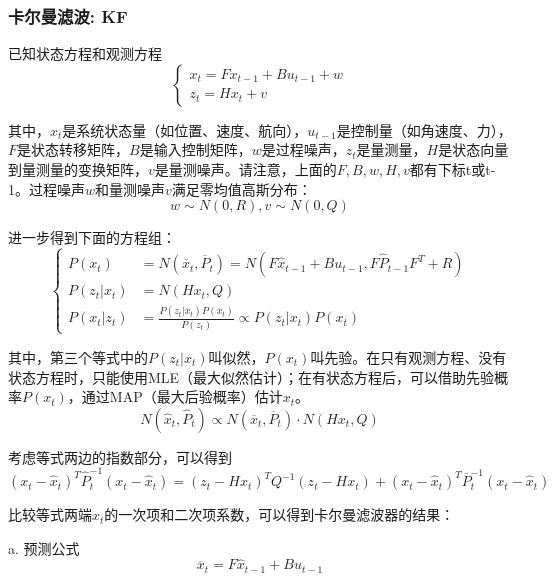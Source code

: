 \subsubsection*{卡尔曼滤波: KF}
已知状态方程和观测方程
\begin{equation}
  \left\{
  \begin{array}{lr}
    x_t = F x_{t-1} + B u_{t-1} + w \\
    z_t = H x_t + v
  \end{array}
  \right.
\end{equation}
\par 其中，$x_t$是系统状态量（如位置、速度、航向），$u_{t-1}$是控制量（如角速度、力），$F$是状态转移矩阵，$B$是输入控制矩阵，$w$是过程噪声，$z_t$是量测量，$H$是状态向量到量测量的变换矩阵，$v$是量测噪声。请注意，上面的$F,B,w,H,v$都有下标t或t-1。过程噪声$w$和量测噪声$v$满足零均值高斯分布：
\begin{equation}
  w \sim N(0,R),v \sim N(0,Q)
\end{equation}
\par 进一步得到下面的方程组：
\begin{equation}
  \left\{
  \begin{split}
    P(x_t)
    &=N(\overline{x}_t,\overline{P}_t)
    =N(F \hat{x}_{t-1} + B u_{t-1}, F \hat{P}_{t-1} F^T + R) \\
    P(z_t|x_t) &=N(H x_t,Q) \\
    P(x_t|z_t) &= \frac{P(z_t|x_t) P(x_t)}{P(z_t)} \propto P(z_t|x_t) P(x_t)
  \end{split}
  \right.
\end{equation}
\par 其中，第三个等式中的$P(z_t|x_t)$叫似然，$P(x_t)$叫先验。在只有观测方程、没有状态方程时，只能使用MLE（最大似然估计）；在有状态方程后，可以借助先验概率$P(x_t)$，通过MAP（最大后验概率）估计$x_t$。
\begin{equation}
  N(\hat{x}_t,\hat{P}_t) \propto N(\overline{x}_t,\overline{P}_t) \cdot N(H x_t,Q)
\end{equation}
\par 考虑等式两边的指数部分，可以得到
\begin{equation}
  (x_t-\hat{x}_t)^T\hat{P}_t^{-1}(x_t-\hat{x}_t)
  =
  (z_t-H x_t)^T Q^{-1} (z_t-H x_t)
  +
  (x_t-\hat{x}_t)^T \overline{P}_t^{-1} (x_t-\hat{x}_t)
\end{equation}
\par 比较等式两端$x_t$的一次项和二次项系数，可以得到卡尔曼滤波器的结果：
\par {a. 预测公式}
\begin{equation}
  \overline{x}_t=F\hat{x}_{t-1} + B u_{t-1}
\end{equation}

